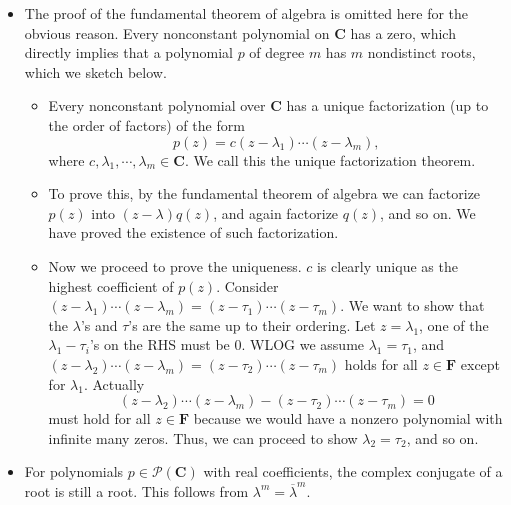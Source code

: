 \documentclass{article}
\newcommand{\C}{\mathbf{C}}
\newcommand{\F}{\mathbf{F}}
\newcommand{\conj}[1]{\overline{#1}}
\begin{document}
\begin{itemize}
    \item The proof of the fundamental theorem of algebra is omitted here for the obvious reason. Every nonconstant polynomial on $\C$ has a zero, which directly implies that a polynomial $p$ of degree $m$ has $m$ nondistinct roots, which we sketch below.
    \begin{itemize}
        \item Every nonconstant polynomial over $\C$ has a unique factorization (up to the order of factors) of the form 
        \begin{equation}
            p(z) = c(z - \lambda_1)\cdots(z-\lambda_m), \tag{$\star$}
        \end{equation}
        where $c, \lambda_1,\cdots,\lambda_m \in \C$. We call this the unique factorization theorem.
    \end{itemize}
    \begin{itemize}
        \item To prove this, by the fundamental theorem of algebra we can factorize $p(z)$ into $(z-\lambda)q(z)$, and again factorize $q(z)$, and so on. We have proved the existence of such factorization.
        \item Now we proceed to prove the uniqueness. $c$ is clearly unique as the highest coefficient of $p(z)$. Consider $(z - \lambda_1)\cdots(z-\lambda_m)=(z - \tau_1)\cdots(z-\tau_m)$. We want to show that the $\lambda$'s and $\tau$'s are the same up to their ordering. Let $z = \lambda_1$, one of the $\lambda_1 - \tau_i$'s on the RHS must be 0. WLOG we assume $\lambda_1 = \tau_1$, and $(z - \lambda_2)\cdots(z-\lambda_m)=(z - \tau_2)\cdots(z-\tau_m)$ holds for all $z \in \F$ except for $\lambda_1$. Actually $$(z - \lambda_2)\cdots(z-\lambda_m) - (z - \tau_2)\cdots(z-\tau_m) = 0$$ must hold for all $z \in \F$ because we would have a nonzero polynomial with infinite many zeros. Thus, we can proceed to show $\lambda_2 = \tau_2$, and so on.
    \end{itemize}
    \item For polynomials $p \in \mathcal{P}(\C)$ with real coefficients, the complex conjugate of a root is still a root. This follows from $\lambda^m = \conj{\lambda}^m$.
    

\end{itemize}
\end{document}
